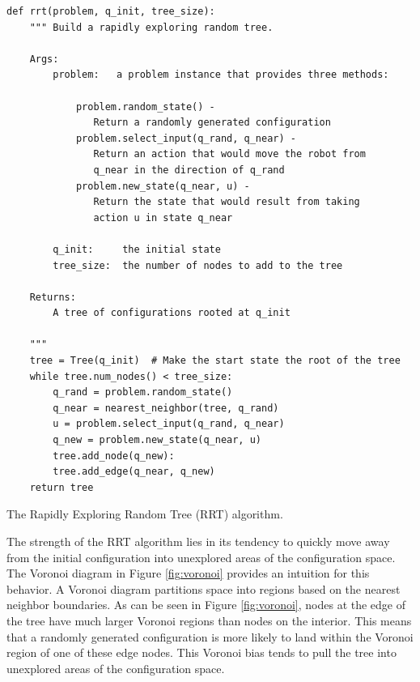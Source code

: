 \begin{listing}[H]
\begin{verbatim}
def rrt(problem, q_init, tree_size):
    """ Build a rapidly exploring random tree. 
    
    Args:
        problem:   a problem instance that provides three methods:

            problem.random_state() - 
               Return a randomly generated configuration
            problem.select_input(q_rand, q_near) -
               Return an action that would move the robot from 
               q_near in the direction of q_rand
            problem.new_state(q_near, u) -
               Return the state that would result from taking 
               action u in state q_near

        q_init:     the initial state
        tree_size:  the number of nodes to add to the tree
        
    Returns:
        A tree of configurations rooted at q_init

    """
    tree = Tree(q_init)  # Make the start state the root of the tree
    while tree.num_nodes() < tree_size:
        q_rand = problem.random_state()
        q_near = nearest_neighbor(tree, q_rand)
        u = problem.select_input(q_rand, q_near)
        q_new = problem.new_state(q_near, u)
        tree.add_node(q_new):
        tree.add_edge(q_near, q_new)
    return tree

\end{verbatim}
\caption{The Rapidly Exploring Random Tree (RRT) algorithm.}
\label{lst:rrt}
\end{listing}


The strength of the RRT algorithm lies in its tendency to quickly move
away from the initial configuration into unexplored areas of the
configuration space. The Voronoi diagram in Figure \ref{fig:voronoi}
provides an intuition for this behavior.  A Voronoi diagram partitions
space into regions based on the nearest neighbor boundaries.  As can
be seen in Figure \ref{fig:voronoi}, nodes at the edge of the tree
have much larger Voronoi regions than nodes on the interior. This
means that a randomly generated configuration is more likely to
land within the Voronoi region of one of these edge nodes.  This
Voronoi bias tends to pull the tree into unexplored areas of the
configuration space.



